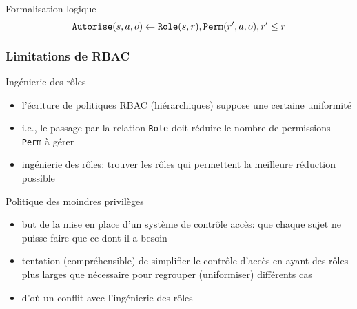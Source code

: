 \begin{reveals}
\begin{frame}
  \vfill
  
  \begin{block}{Formalisation logique}
    \[
      \text{\tt Autorise}(s,a,o) \leftarrow \text{\tt Role}(s,r),\text{\tt Perm}(r',a,o),r'\le r
    \]
  \end{block}

  \vfill
\end{frame}

\begin{frame}
  \frametitle{Limitations de RBAC}

  \vfill

   \begin{block}{Ingénierie des rôles}
     \begin{itemize}
     \item l'écriture de politiques RBAC (hiérarchiques) suppose une
       certaine uniformité
     \item i.e., le passage par la relation \texttt{Role} doit réduire le nombre de
       permissions \texttt{Perm} à gérer
     \item ingénierie des rôles: trouver les rôles qui permettent la
       meilleure réduction possible
     \end{itemize}
  \end{block}

  \vfill
  \begin{block}{Politique des moindres privilèges}
    \begin{itemize}
    \item but de la mise en place d'un système de contrôle accès: que
      chaque sujet ne puisse faire que ce dont il a besoin
    \item tentation (compréhensible) de simplifier le contrôle d'accès
      en ayant des rôles plus larges que nécessaire pour regrouper
      (uniformiser) différents cas
    \item d'où un conflit avec l'ingénierie des rôles
    \end{itemize}
  \end{block}

  \vfill

\end{frame}





\end{reveals}

 

